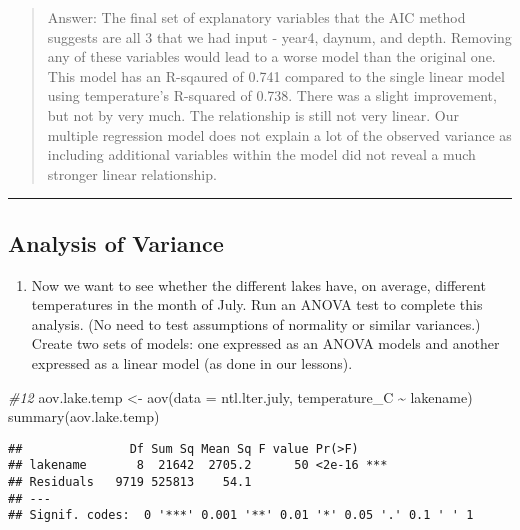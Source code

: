 \documentclass[
]{article}
\newenvironment{Shaded}{\begin{snugshade}}{\end{snugshade}}
\newcommand{\AttributeTok}[1]{\textcolor[rgb]{0.77,0.63,0.00}{#1}}
\newcommand{\CommentTok}[1]{\textcolor[rgb]{0.56,0.35,0.01}{\textit{#1}}}
\newcommand{\FunctionTok}[1]{\textcolor[rgb]{0.00,0.00,0.00}{#1}}
\newcommand{\NormalTok}[1]{#1}
\newcommand{\OtherTok}[1]{\textcolor[rgb]{0.56,0.35,0.01}{#1}}
\newcommand{\SpecialCharTok}[1]{\textcolor[rgb]{0.00,0.00,0.00}{#1}}
\providecommand{\tightlist}{%
  \setlength{\itemsep}{0pt}\setlength{\parskip}{0pt}}
\begin{document}
\begin{quote}
Answer: The final set of explanatory variables that the AIC method
suggests are all 3 that we had input - year4, daynum, and depth.
Removing any of these variables would lead to a worse model than the
original one. This model has an R-sqaured of 0.741 compared to the
single linear model using temperature's R-squared of 0.738. There was a
slight improvement, but not by very much. The relationship is still not
very linear. Our multiple regression model does not explain a lot of the
observed variance as including additional variables within the model did
not reveal a much stronger linear relationship.
\end{quote}

\begin{center}\rule{0.5\linewidth}{0.5pt}\end{center}

\hypertarget{analysis-of-variance}{%
\subsection{Analysis of Variance}\label{analysis-of-variance}}

\begin{enumerate}
\def\labelenumi{\arabic{enumi}.}
\setcounter{enumi}{11}
\tightlist
\item
  Now we want to see whether the different lakes have, on average,
  different temperatures in the month of July. Run an ANOVA test to
  complete this analysis. (No need to test assumptions of normality or
  similar variances.) Create two sets of models: one expressed as an
  ANOVA models and another expressed as a linear model (as done in our
  lessons).
\end{enumerate}

\begin{Shaded}
\begin{Highlighting}[]
\CommentTok{\#12}
\NormalTok{aov.lake.temp }\OtherTok{\textless{}{-}} \FunctionTok{aov}\NormalTok{(}\AttributeTok{data =}\NormalTok{ ntl.lter.july, temperature\_C }\SpecialCharTok{\textasciitilde{}}\NormalTok{ lakename)}
\FunctionTok{summary}\NormalTok{(aov.lake.temp)}
\end{Highlighting}
\end{Shaded}

\begin{verbatim}
##               Df Sum Sq Mean Sq F value Pr(>F)    
## lakename       8  21642  2705.2      50 <2e-16 ***
## Residuals   9719 525813    54.1                   
## ---
## Signif. codes:  0 '***' 0.001 '**' 0.01 '*' 0.05 '.' 0.1 ' ' 1
\end{verbatim}
\end{document}
